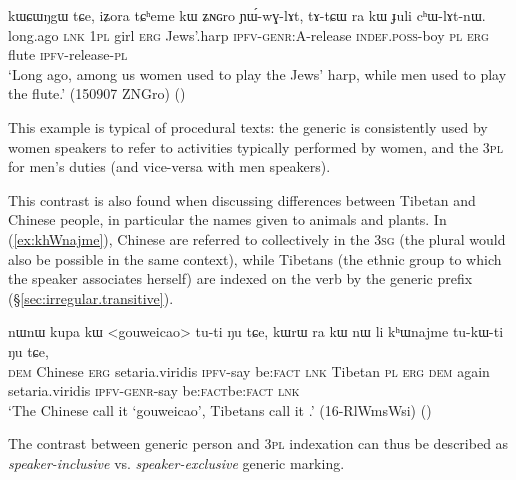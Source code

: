 \begin{exe}
\ex \label{ex:Juli.chWlAtnW}
\gll kɯɕɯŋgɯ tɕe, iʑora tɕʰeme kɯ ʑɴɢro ɲɯ́-wɣ-lɤt, tɤ-tɕɯ ra kɯ ɟuli cʰɯ-lɤt-nɯ. \\
 long.ago \textsc{lnk} \textsc{1pl} girl  \textsc{erg} Jews'.harp \textsc{ipfv}-\textsc{genr}:\textsc{A}-release \textsc{indef}.\textsc{poss}-boy \textsc{pl} \textsc{erg} flute \textsc{ipfv}-release-\textsc{pl}  \\
 \glt `Long ago, among us women used to play the Jews' harp, while men used to play the flute.' (150907 ZNGro)
()
\end{exe}
 
This example is typical of procedural texts: the generic is consistently used by women speakers to refer to activities typically performed by women, and the \textsc{3pl} for men's duties (and vice-versa with men speakers). 

This contrast is also found when discussing differences between Tibetan and Chinese people, in particular the names given to animals and plants. In (\ref{ex:khWnajme}), Chinese are referred to collectively in the \textsc{3sg} (the plural would also be possible in the same context), while Tibetans (the ethnic group to which the speaker associates herself) are indexed on the verb by the generic  prefix (§\ref{sec:irregular.transitive}).

\begin{exe}
\ex \label{ex:khWnajme}
\gll nɯnɯ kupa kɯ <gouweicao> tu-ti ŋu tɕe, kɯrɯ ra kɯ nɯ li kʰɯnajme tu-kɯ-ti ŋu tɕe, \\
\textsc{dem} Chinese \textsc{erg} setaria.viridis \textsc{ipfv}-say be:\textsc{fact} \textsc{lnk}  Tibetan \textsc{pl} \textsc{erg} \textsc{dem} again setaria.viridis \textsc{ipfv}-\textsc{genr}-say be:\textsc{fact}be:\textsc{fact} \textsc{lnk}  \\
\glt `The Chinese call it `gouweicao', Tibetans call it .' (16-RlWmsWsi)
()
\end{exe}

The contrast between  generic person and \textsc{3pl} indexation can thus be described as \textit{speaker-inclusive} vs. \textit{speaker-exclusive} generic marking.

